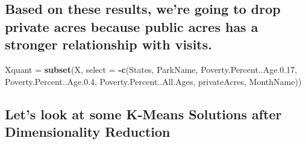 \documentclass[
]{article}
\newenvironment{Shaded}{\begin{snugshade}}{\end{snugshade}}
\newcommand{\DataTypeTok}[1]{\textcolor[rgb]{0.13,0.29,0.53}{#1}}
\newcommand{\FloatTok}[1]{\textcolor[rgb]{0.00,0.00,0.81}{#1}}
\newcommand{\KeywordTok}[1]{\textcolor[rgb]{0.13,0.29,0.53}{\textbf{#1}}}
\newcommand{\NormalTok}[1]{#1}
\newcommand{\OperatorTok}[1]{\textcolor[rgb]{0.81,0.36,0.00}{\textbf{#1}}}
\newcommand{\StringTok}[1]{\textcolor[rgb]{0.31,0.60,0.02}{#1}}
\begin{document}
\hypertarget{based-on-these-results-were-going-to-drop-private-acres-because-public-acres-has-a-stronger-relationship-with-visits.}{%
\subsection{Based on these results, we're going to drop private acres
because public acres has a stronger relationship with
visits.}\label{based-on-these-results-were-going-to-drop-private-acres-because-public-acres-has-a-stronger-relationship-with-visits.}}

\begin{Shaded}
\begin{Highlighting}[]
\NormalTok{Xquant =}\StringTok{ }\KeywordTok{subset}\NormalTok{(X, }\DataTypeTok{select =} \OperatorTok{-}\KeywordTok{c}\NormalTok{(States, ParkName, Poverty.Percent..Age.}\FloatTok{0.17}\NormalTok{, Poverty.Percent..Age.}\FloatTok{0.4}\NormalTok{, Poverty.Percent..All.Ages, privateAcres, MonthName))}
\end{Highlighting}
\end{Shaded}

\hypertarget{lets-look-at-some-k-means-solutions-after-dimensionality-reduction}{%
\subsection{Let's look at some K-Means Solutions after Dimensionality
Reduction}\label{lets-look-at-some-k-means-solutions-after-dimensionality-reduction}}

\begin{Shaded}
\end{Shaded}
\end{document}
